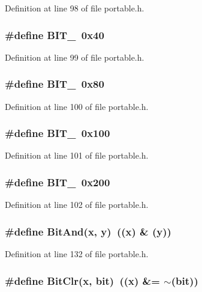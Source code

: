Definition at line 98 of file portable.h.
\subsubsection{\setlength{\rightskip}{0pt plus 5cm}\#define BIT\_\ 0x40}\label{portable_8h_a18}




Definition at line 99 of file portable.h.
\subsubsection{\setlength{\rightskip}{0pt plus 5cm}\#define BIT\_\ 0x80}\label{portable_8h_a19}




Definition at line 100 of file portable.h.
\subsubsection{\setlength{\rightskip}{0pt plus 5cm}\#define BIT\_\ 0x100}\label{portable_8h_a20}




Definition at line 101 of file portable.h.
\subsubsection{\setlength{\rightskip}{0pt plus 5cm}\#define BIT\_\ 0x200}\label{portable_8h_a21}




Definition at line 102 of file portable.h.
\subsubsection{\setlength{\rightskip}{0pt plus 5cm}\#define Bit\-And(x, y)\ ((x) \& (y))}\label{portable_8h_a47}




Definition at line 132 of file portable.h.
\subsubsection{\setlength{\rightskip}{0pt plus 5cm}\#define Bit\-Clr(x, bit)\ ((x) \&= $\sim$(bit))}\label{portable_8h_a46}





